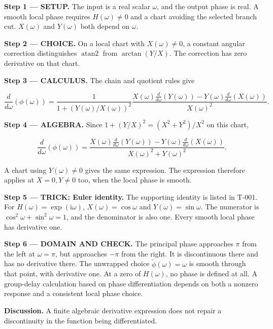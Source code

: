 \documentclass[11pt,oneside,openany]{book}
\begin{document}
\textbf{Step 1 --- SETUP.} The input is a real scalar \(\omega\), and the output phase is real. A smooth local phase requires \(H(\omega)\ne0\) and a chart avoiding the selected branch cut. \(X(\omega)\) and \(Y(\omega)\) both depend on \(\omega\).

\begin{ChoiceStep}
\textbf{Step 2 --- CHOICE.} On a local chart with \(X(\omega)\ne0\), a constant angular correction distinguishes \(\operatorname{atan2}\) from \(\arctan(Y/X)\). The correction has zero derivative on that chart.

\end{ChoiceStep}
\textbf{Step 3 --- CALCULUS.} The chain and quotient rules give

\[
\frac{d}{d\omega}\left(\phi(\omega)\right)
=\frac{1}{1+(Y(\omega)/X(\omega))^2}
\frac{X(\omega)\frac{d}{d\omega}(Y(\omega))-Y(\omega)\frac{d}{d\omega}(X(\omega))}{X(\omega)^2}.
\]

\begingroup\color{AlgebraBlue}
\textbf{Step 4 --- ALGEBRA.} Since \(1+(Y/X)^2=(X^2+Y^2)/X^2\) on this chart,

\[
\frac{d}{d\omega}\left(\phi(\omega)\right)
=\frac{X(\omega)\frac{d}{d\omega}(Y(\omega))-Y(\omega)\frac{d}{d\omega}(X(\omega))}{X(\omega)^2+Y(\omega)^2}.
\]

A chart using \(Y(\omega)\ne0\) gives the same expression. The expression therefore applies at \(X=0,Y\ne0\) too, when the local phase is smooth.

\endgroup
\begingroup\color{TrickPurple}
\textbf{Step 5 --- TRICK: Euler identity.} The supporting identity is listed in T-001. For \(H(\omega)=\exp(\mathrm{i}\omega)\), \(X(\omega)=\cos\omega\) and \(Y(\omega)=\sin\omega\). The numerator is \(\cos^2\omega+\sin^2\omega=1\), and the denominator is also one. Every smooth local phase has derivative one.

\endgroup
\begin{DomainStep}
\textbf{Step 6 --- DOMAIN AND CHECK.} The principal phase approaches \(\pi\) from the left at \(\omega=\pi\), but approaches \(-\pi\) from the right. It is discontinuous there and has no derivative there. The unwrapped choice \(\widetilde\phi(\omega)=\omega\) is smooth through that point, with derivative one. At a zero of \(H(\omega)\), no phase is defined at all. A group-delay calculation based on phase differentiation depends on both a nonzero response and a consistent local phase choice.

\end{DomainStep}
\textbf{Discussion.} A finite algebraic derivative expression does not repair a discontinuity in the function being differentiated.
\clearpage
\end{document}
